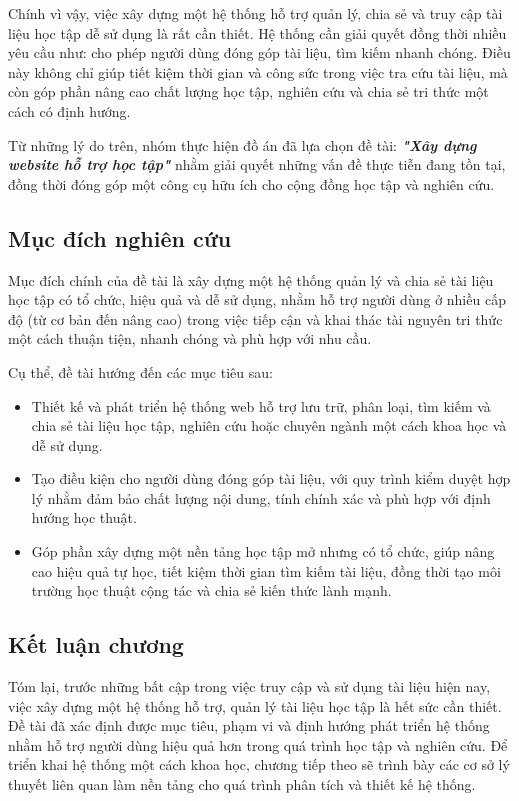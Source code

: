 \documentclass{article}
\begin{document}
	Chính vì vậy, việc xây dựng một hệ thống hỗ trợ quản lý, chia sẻ và truy cập tài liệu học tập dễ sử dụng là rất cần thiết. Hệ thống cần giải quyết đồng thời nhiều yêu cầu như: cho phép người dùng đóng góp tài liệu, tìm kiếm nhanh chóng. Điều này không chỉ giúp tiết kiệm thời gian và công sức trong việc tra cứu tài liệu, mà còn góp phần nâng cao chất lượng học tập, nghiên cứu và chia sẻ tri thức một cách có định hướng.
	
	Từ những lý do trên, nhóm thực hiện đồ án đã lựa chọn đề tài: \textbf{\textit{"Xây dựng website hỗ trợ học tập"}} nhằm giải quyết những vấn đề thực tiễn đang tồn tại, đồng thời đóng góp một công cụ hữu ích cho cộng đồng học tập và nghiên cứu.
	
	\subsection{Mục đích nghiên cứu}
	
	Mục đích chính của đề tài là xây dựng một hệ thống quản lý và chia sẻ tài liệu học tập có tổ chức, hiệu quả và dễ sử dụng, nhằm hỗ trợ người dùng ở nhiều cấp độ (từ cơ bản đến nâng cao) trong việc tiếp cận và khai thác tài nguyên tri thức một cách thuận tiện, nhanh chóng và phù hợp với nhu cầu.
	
	Cụ thể, đề tài hướng đến các mục tiêu sau:

	\begin{itemize}
		\item Thiết kế và phát triển hệ thống web hỗ trợ lưu trữ, phân loại, tìm kiếm và chia sẻ tài liệu học tập, nghiên cứu hoặc chuyên ngành một cách khoa học và dễ sử dụng.
		\item Tạo điều kiện cho người dùng đóng góp tài liệu, với quy trình kiểm duyệt hợp lý nhằm đảm bảo chất lượng nội dung, tính chính xác và phù hợp với định hướng học thuật.
		\item Góp phần xây dựng một nền tảng học tập mở nhưng có tổ chức, giúp nâng cao hiệu quả tự học, tiết kiệm thời gian tìm kiếm tài liệu, đồng thời tạo môi trường học thuật cộng tác và chia sẻ kiến thức lành mạnh.
	\end{itemize}
	
	\subsection{Kết luận chương}
	
	Tóm lại, trước những bất cập trong việc truy cập và sử dụng tài liệu hiện nay, việc xây dựng một hệ thống hỗ trợ, quản lý tài liệu học tập là hết sức cần thiết. Đề tài đã xác định được mục tiêu, phạm vi và định hướng phát triển hệ thống nhằm hỗ trợ người dùng hiệu quả hơn trong quá trình học tập và nghiên cứu. Để triển khai hệ thống một cách khoa học, chương tiếp theo sẽ trình bày các cơ sở lý thuyết liên quan làm nền tảng cho quá trình phân tích và thiết kế hệ thống.
	\newpage
	
\end{document}
